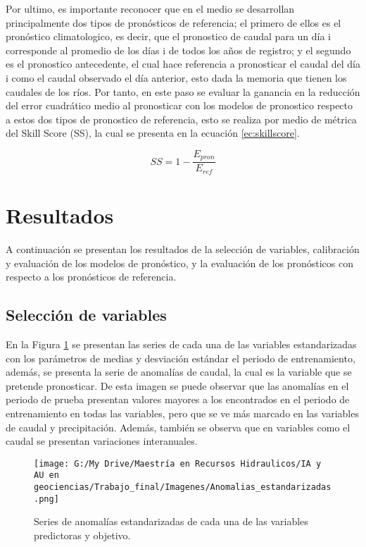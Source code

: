 \documentclass[draft]{agujournal2019}
\begin{document}
Por ultimo, es importante reconocer que en el medio se desarrollan principalmente dos tipos de pronósticos de referencia; el primero de ellos es el pronóstico climatologico, es decir, que el pronostico de caudal para un día i corresponde al promedio de los días i de todos los años de registro; y el segundo es el pronostico antecedente, el cual hace referencia a pronosticar el caudal del día i como el caudal observado el día anterior, esto dada la memoria que tienen los caudales de los ríos. Por tanto, en este paso se evaluar la ganancia en la reducción del error cuadrático medio al pronosticar con los modelos de pronostico respecto a estos dos tipos de pronostico de referencia, esto se realiza por medio de métrica del Skill Score (SS), la cual se presenta en la ecuación \ref{ec:skillscore}.


\begin{equation}
	SS = 1 - \frac{E_{pron}}{E_{ref}}
	\label{ec:skillscore}
\end{equation}

\section{Resultados} 

A continuación se presentan los resultados de la selección de variables, calibración y evaluación de los modelos de pronóstico, y la evaluación de los pronósticos con respecto a los pronósticos de referencia.

\subsection{Selección de variables}

En la Figura \ref{fig:series_estand} se presentan las series de cada una de las variables estandarizadas con los parámetros de medias y desviación estándar el periodo de entrenamiento, además, se presenta la serie de anomalías de caudal, la cual es la variable que se pretende pronosticar. De  esta imagen se puede observar que las anomalías en el periodo de prueba presentan valores mayores a los encontrados en el periodo de entrenamiento en todas las variables, pero que se ve más marcado en las variables de caudal y precipitación. Además, también se observa que en variables como el caudal se presentan variaciones interanuales.

\begin{figure}[!]
	\centering%
	\texttt{[image: G:/My Drive/Maestría en Recursos Hidraulicos/IA y AU en geociencias/Trabajo\_final/Imagenes/Anomalias\_estandarizadas.png]}
	\caption{Series de anomalías estandarizadas de cada una de las variables predictoras y objetivo.} \label{fig:series_estand}
\end{figure}
\end{document}
